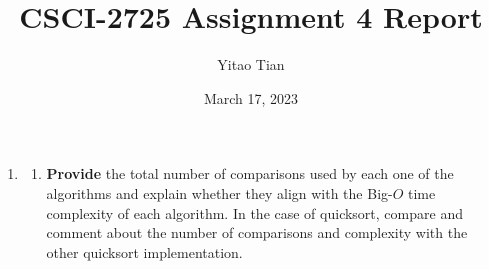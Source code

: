 \documentclass[12pt, a4paper]{article}
\title{CSCI-2725 Assignment 4 Report}
\author{Yitao Tian}
\date{March 17, 2023}
\begin{document}
\maketitle

\begin{enumerate}[start=7]
    
    \item \begin{enumerate}

        \item \textbf{Provide} the total number of comparisons used by each one of the algorithms
        and explain whether they align with the Big-$O$ time complexity of each algorithm.
        In the case of quicksort, compare and comment about the number of comparisons and complexity with the other quicksort implementation.


\end{enumerate}
\end{enumerate}
\end{document}
